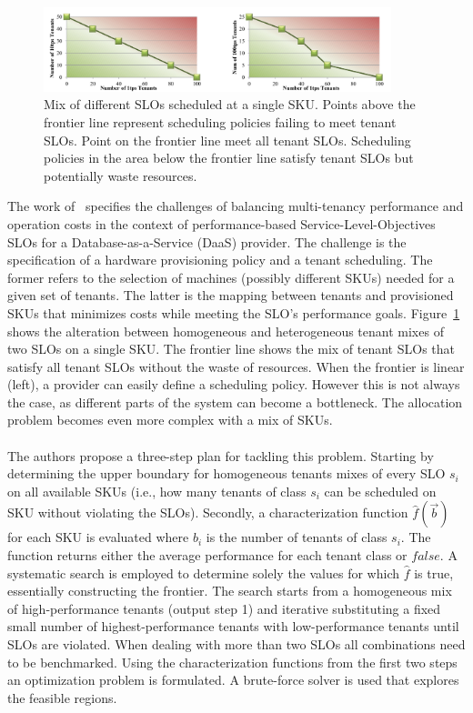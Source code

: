 \begin{figure}[H]
    \centering
    \includegraphics[width=0.9\textwidth]{chapter-related-work/images-towards-slos/sla-mix.png}
    \caption{Mix of different SLOs scheduled at a single SKU. Points above the frontier line represent scheduling policies failing to meet tenant SLOs. Point on the frontier line meet all tenant SLOs. Scheduling policies in the area below the frontier line satisfy tenant SLOs but potentially waste resources.~\cite{lang2014towards}}
    \label{fig:sla-mix}
\end{figure}
The work of~\cite{lang2014towards} specifies the challenges of balancing multi-tenancy performance and operation costs in the context of performance-based Service-Level-Objectives SLOs for a Database-as-a-Service (DaaS) provider. The challenge is the specification of a hardware provisioning policy and a tenant scheduling. The former refers to the selection of machines (possibly different SKUs) needed for a given set of tenants. The latter is the mapping between tenants and provisioned SKUs that minimizes costs while meeting the SLO's performance goals. Figure~\ref{fig:sla-mix} shows the alteration between homogeneous and heterogeneous tenant mixes of two SLOs on a single SKU. The frontier line shows the mix of tenant SLOs that satisfy all tenant SLOs without the waste of resources. When the frontier is linear (left), a provider can easily define a scheduling policy. However this is not always the case, as different parts of the system can become a bottleneck. The allocation problem becomes even more complex with a mix of SKUs.~\cite{lang2014towards} \\\\
The authors propose a three-step plan for tackling this problem. Starting by determining the upper boundary for homogeneous tenants mixes of every SLO $s_{i}$ on all available SKUs (i.e., how many tenants of class $s_{i}$ can be scheduled on SKU without violating the SLOs). Secondly, a characterization function $\hat{f}(\vec{b})$ for each SKU is evaluated where $b_{i}$ is the number of tenants of class $s_{i}$. The function returns either the average performance for each tenant class or $false$. A systematic search is employed to determine solely the values for which  $\hat{f}$ is true, essentially constructing the frontier. The search starts from a homogeneous mix of high-performance tenants (output step 1) and iterative substituting a fixed small number of highest-performance tenants with low-performance tenants until SLOs are violated. When dealing with more than two SLOs all combinations need to be benchmarked. Using the characterization functions from the first two steps an optimization problem is formulated. A brute-force solver is used that explores the feasible regions.~\cite{lang2014towards}

